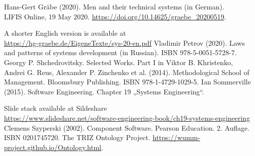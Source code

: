 \documentclass[11pt,a4paper]{article}
\begin{document}
\begin{thebibliography}{xxx}
 Hans-Gert Gräbe (2020). Men and their technical systems
  (in German).\\ LIFIS Online, 19 May 2020.
  \url{https://doi.org/10.14625/graebe_20200519}.

  A shorter English version is available at\\
  \url{https://hg-graebe.de/EigeneTexte/sys-20-en.pdf}
 Vladimir Petrov (2020). Laws and patterns of systems
  development (in Russian). ISBN 978-5-0051-5728-7.
 Georgy P. Shchedrovitsky. Selected Works. Part I in Viktor
  B. Khristenko, Andrei G. Reus, Alexander P. Zinchenko et al. (2014).
  Methodological School of Management. Bloomsbury Publishing.  ISBN
  978-1-4729-1029-5.
 Ian Sommerville (2015). Software Engineering.
  Chapter 19 „Systems Engineering“.

  Slide stack available at Sildeshare\\{\small
  \url{https://www.slideshare.net/software-engineering-book/ch19-systems-engineering}}
 Clemens Szyperski (2002). Component Software. Pearson
  Education.  2. Auf\-lage.  ISBN 0201745720.
 The TRIZ Ontology Project.
  \url{https://wumm-project.github.io/Ontology.html}.
\end{thebibliography}
\end{document}
